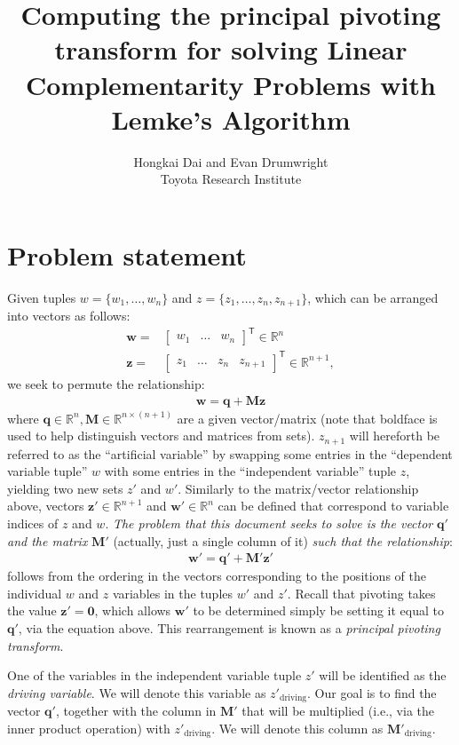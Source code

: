 \documentclass{article}
\title{Computing the principal pivoting transform for solving Linear Complementarity Problems with Lemke's Algorithm}
\date{}
\author{Hongkai Dai and Evan Drumwright\\Toyota Research Institute}
\providecommand{\tr}[1]{{#1}^{\ensuremath{\mathsf{T}}}} %
\providecommand{\vect}[1]{\bm#1}
\providecommand{\mat}[1]{\mathbf#1}
\newcommand{\1}{(\textos{1})\!}
\newcommand{\2}{(\textos{2})\!}
\newcommand{\3}{(\textos{3})\!}
\newcommand{\4}{(\textos{4})\!}
\newcommand{\5}{(\textos{5})\!}
\newcommand{\6}{(\textos{6})\!}
\newcommand{\7}{(\textos{7})\!}
\newcommand{\8}{(\textos{8})\!}
\begin{document}
\maketitle
\section{Problem statement} Given tuples $w = \{ w_1, \hdots, w_n \}$ and $z = \{z_1, \hdots, z_n, z_{n+1}\}$, which can be arranged into vectors as follows:
\begin{align*}
	\vect{w} =& \tr{\begin{bmatrix}w_1 & \hdots & w_n \end{bmatrix}}\in\mathbb{R}^n \\
		\vect{z} =& \tr{\begin{bmatrix}z_1 & \hdots & z_n & z_{n+1} \end{bmatrix}}\in\mathbb{R}^{n+1},
\end{align*}
we seek to permute the relationship:
\begin{align*}
	\vect{w} = \vect{q} + \mat{M}\vect{z}
\end{align*}
where $\vect{q}\in\mathbb{R}^n, \mat{M}\in\mathbb{R}^{n\times (n+1)}$ are a given vector/matrix (note that boldface is used to help distinguish vectors and matrices from sets). $z_{n+1}$ will hereforth be referred to as the ``artificial variable'' by swapping some entries in the ``dependent variable tuple'' $w$ with some entries in the ``independent variable'' tuple $z$, yielding two new sets $z'$ and $w'$. Similarly to the matrix/vector relationship above, vectors $\vect{z}' \in \mathbb{R}^{n+1}$ and $\vect{w}' \in \mathbb{R}^n$ can be defined that correspond to variable indices of $z$ and $w$. \emph{The problem that this document seeks to solve is the vector} $\vect{q}'$ \emph{and the matrix} $\mat{M}'$ (actually, just a single column of it) \emph{such that the relationship}:
\begin{align*}
\vect{w}' = \vect{q}' + \mat{M}'\vect{z}'
\end{align*}
follows from the ordering in the vectors corresponding to the positions of the
individual $w$ and $z$ variables in the tuples $w'$ and $z'$. Recall that
pivoting takes the value $\vect{z'} = \vect{0}$, which allows $\vect{w'}$ to be
determined simply be setting it equal to $\vect{q}'$, via the equation above.
This rearrangement is known as a \emph{principal pivoting transform}. 

One of the variables in the independent variable tuple $z'$ will be identified as the \textit{driving variable}. We will denote this variable as $z'_{\textrm{driving}}$. Our goal is to find the vector $\vect{q}'$, together with the column in $\mat{M}'$ that will be multiplied (i.e., via the inner product operation) with $z'_{\textrm{driving}}$. We will denote this column as $\mat{M}'_{\textrm{driving}}$.
\end{document}
